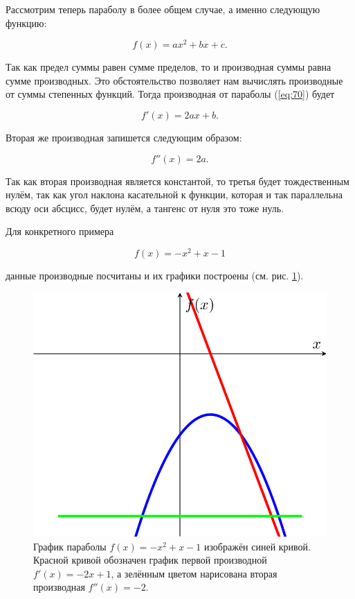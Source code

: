 \documentclass[12pt]{article}
\begin{document}
Рассмотрим теперь параболу в более общем случае, а именно следующую функцию:

\begin{equation}\label{eq:70}
	f(x)=ax^2+bx+c.
\end{equation}

Так как предел суммы равен сумме пределов, то и производная суммы равна сумме производных. Это обстоятельство позволяет нам вычислять производные от суммы степенных функций. Тогда производная от параболы (\ref{eq:70}) будет

\begin{equation}
	f'(x)=2ax+b.
\end{equation}

Вторая же производная запишется следующим образом:

\begin{equation}
	f''(x)=2a.
\end{equation}

Так как вторая производная является константой, то третья будет тождественным нулём, так как угол наклона касательной к функции, которая и так параллельна всюду оси абсцисс, будет нулём, а тангенс от нуля это тоже нуль.

Для конкретного примера 

\begin{equation}
	f(x) = -x^2 + x - 1
\end{equation}

данные производные посчитаны и их графики построены (см. рис. \ref{fig:70}).

\begin{figure}[htbp]
\centering
\includegraphics[width=1\linewidth]{fig5}
\caption{График параболы $f(x) = -x^2 + x - 1$ изображён синей кривой. Красной кривой обозначен график первой производной $f'(x) = -2x+1$, а зелённым цветом нарисована вторая производная $f''(x) = -2$.}
\label{fig:70}
\end{figure}
\end{document}
